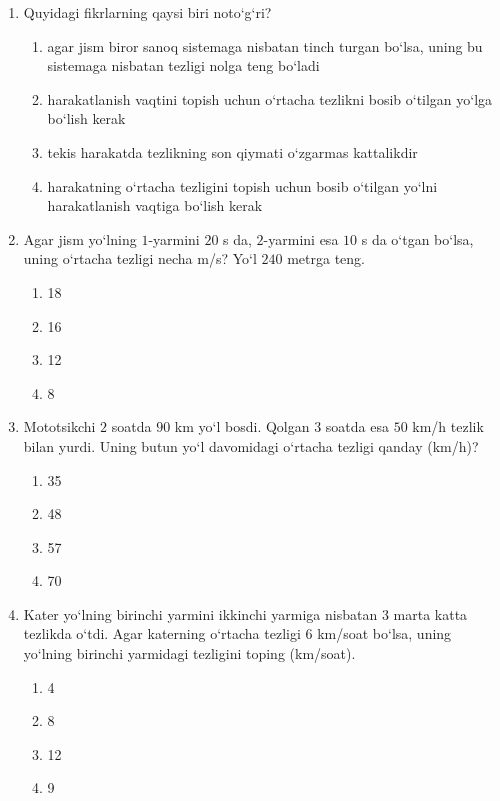 \begin{enumerate}

\item Quyidagi fikrlarning qaysi biri noto‘g‘ri?

\begin{enumerate}[label=\Alph*)]
\item agar jism biror sanoq sistemaga nisbatan tinch turgan bo‘lsa, uning bu sistemaga nisbatan tezligi nolga teng bo‘ladi
\item harakatlanish vaqtini topish uchun o‘rtacha tezlikni bosib o‘tilgan yo‘lga bo‘lish kerak
\item tekis harakatda tezlikning son qiymati o‘zgarmas kattalikdir
\item harakatning o‘rtacha tezligini topish uchun bosib o‘tilgan yo‘lni harakatlanish vaqtiga bo‘lish kerak
\end{enumerate}


\item Agar jism yo‘lning $1$-yarmini $20$ s da, $2$-yarmini esa $10$ s da o‘tgan bo‘lsa,
uning o‘rtacha tezligi necha m/s? Yo‘l $240$ metrga teng.

\begin{enumerate}[label=\Alph*)]
\item 18
\item 16
\item 12
\item 8
\end{enumerate}


\item Mototsikchi $2$ soatda $90$ km yo‘l bosdi. Qolgan $3$ soatda esa
$50$ km/h tezlik bilan yurdi. Uning butun yo‘l davomidagi
o‘rtacha tezligi qanday (km/h)?

\begin{enumerate}[label=\Alph*)]
\item 35
\item 48
\item 57
\item 70
\end{enumerate}


\item Kater yo‘lning birinchi yarmini ikkinchi yarmiga nisbatan
$3$ marta katta tezlikda o‘tdi. Agar katerning o‘rtacha tezligi
$6$ km/soat bo‘lsa, uning yo‘lning birinchi yarmidagi tezligini toping
(km/soat).

\begin{enumerate}[label=\Alph*)]
\item 4
\item 8
\item 12
\item 9
\end{enumerate}



\end{enumerate}
